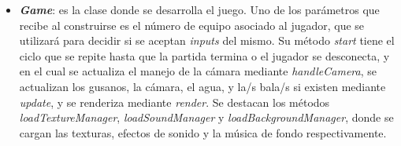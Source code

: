 \begin{itemize}
	\item \textbf{\textit{Game}}: es la clase donde se desarrolla el juego. Uno de los parámetros que recibe al construirse es el número de equipo asociado al jugador, que se utilizará para decidir si se aceptan \textit{inputs} del mismo. Su método \textit{start} tiene el ciclo que se repite hasta que la partida termina o el jugador se desconecta, y en el cual se actualiza el manejo de la cámara mediante \textit{handleCamera}, se actualizan los gusanos, la cámara, el agua, y la/s bala/s si existen mediante \textit{update}, y se renderiza mediante \textit{render}. Se destacan los métodos \textit{loadTextureManager}, \textit{loadSoundManager} y \textit{loadBackgroundManager}, donde se cargan las texturas, efectos de sonido y la música de fondo respectivamente.
\end{itemize}

